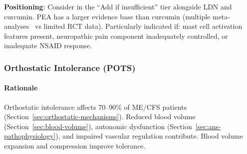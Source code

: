 \textbf{Positioning}: Consider in the ``Add if insufficient'' tier alongside LDN and curcumin. PEA has a larger evidence base than curcumin (multiple meta-analyses~\cite{LangIllievich2023PEA} vs limited RCT data). Particularly indicated if: mast cell activation features present, neuropathic pain component inadequately controlled, or inadequate NSAID response.

\subsubsection{Orthostatic Intolerance (POTS)}

\paragraph{Rationale}
Orthostatic intolerance affects 70--90\% of ME/CFS patients (Section~\ref{sec:orthostatic-mechanisms}). Reduced blood volume (Section~\ref{sec:blood-volume}), autonomic dysfunction (Section~\ref{sec:ans-pathophysiology}), and impaired vascular regulation contribute. Blood volume expansion and compression improve tolerance.

